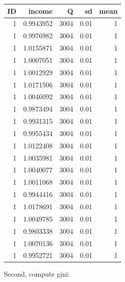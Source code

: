 \documentclass[
]{book}
\newenvironment{Shaded}{\begin{snugshade}}{\end{snugshade}}
\newcommand{\CommentTok}[1]{\textcolor[rgb]{0.56,0.35,0.01}{\textit{#1}}}
\newcommand{\DataTypeTok}[1]{\textcolor[rgb]{0.13,0.29,0.53}{#1}}
\newcommand{\KeywordTok}[1]{\textcolor[rgb]{0.13,0.29,0.53}{\textbf{#1}}}
\newcommand{\NormalTok}[1]{#1}
\newcommand{\OperatorTok}[1]{\textcolor[rgb]{0.81,0.36,0.00}{\textbf{#1}}}
\newcommand{\StringTok}[1]{\textcolor[rgb]{0.31,0.60,0.02}{#1}}
\begin{document}
\begin{table}[!h]
\centering
\begin{tabular}{r|r|r|r|r}
\hline
ID & income & Q & sd & mean\\
\hline
\rowcolor{gray!6}  1 & 0.9943952 & 3004 & 0.01 & 1\\
\hline
1 & 0.9976982 & 3004 & 0.01 & 1\\
\hline
\rowcolor{gray!6}  1 & 1.0155871 & 3004 & 0.01 & 1\\
\hline
1 & 1.0007051 & 3004 & 0.01 & 1\\
\hline
\rowcolor{gray!6}  1 & 1.0012929 & 3004 & 0.01 & 1\\
\hline
1 & 1.0171506 & 3004 & 0.01 & 1\\
\hline
\rowcolor{gray!6}  1 & 1.0046092 & 3004 & 0.01 & 1\\
\hline
1 & 0.9873494 & 3004 & 0.01 & 1\\
\hline
\rowcolor{gray!6}  1 & 0.9931315 & 3004 & 0.01 & 1\\
\hline
1 & 0.9955434 & 3004 & 0.01 & 1\\
\hline
\rowcolor{gray!6}  1 & 1.0122408 & 3004 & 0.01 & 1\\
\hline
1 & 1.0035981 & 3004 & 0.01 & 1\\
\hline
\rowcolor{gray!6}  1 & 1.0040077 & 3004 & 0.01 & 1\\
\hline
1 & 1.0011068 & 3004 & 0.01 & 1\\
\hline
\rowcolor{gray!6}  1 & 0.9944416 & 3004 & 0.01 & 1\\
\hline
1 & 1.0178691 & 3004 & 0.01 & 1\\
\hline
\rowcolor{gray!6}  1 & 1.0049785 & 3004 & 0.01 & 1\\
\hline
1 & 0.9803338 & 3004 & 0.01 & 1\\
\hline
\rowcolor{gray!6}  1 & 1.0070136 & 3004 & 0.01 & 1\\
\hline
1 & 0.9952721 & 3004 & 0.01 & 1\\
\hline
\end{tabular}
\end{table}

Second, compute gini:

\begin{Shaded}
\end{Shaded}
\end{document}
